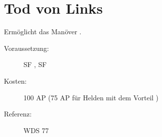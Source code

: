 \section{Tod von Links}
\label{sf.tod_von_links}
Ermöglicht das Manöver .
\begin{description}
    \item[Voraussetzung:]
        SF , SF 
    \item [Kosten:]
        100 AP (75 AP für Helden mit dem Vorteil )
    \item [Referenz:]
        WDS 77
\end{description}
